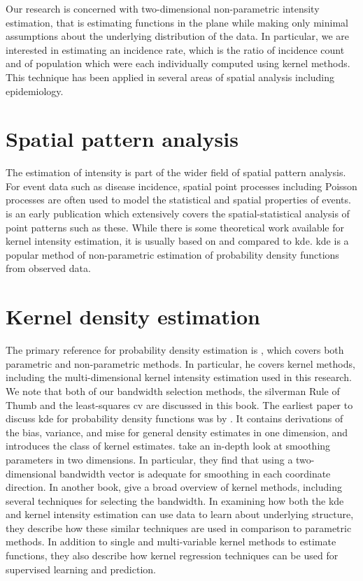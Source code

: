 

Our research is concerned with two-dimensional non-parametric intensity estimation,
that is estimating functions in the plane while making only minimal assumptions about the underlying distribution of the data. 
In particular, we are interested in estimating an incidence rate,
which is the ratio of incidence count and of population which were each individually computed using kernel methods.
This technique has been applied in several areas of spatial analysis including epidemiology.

\section{Spatial pattern analysis}

The estimation of intensity is part of the wider field of spatial pattern analysis.
For event data such as disease incidence,
spatial point processes including Poisson processes are often used to model the statistical and spatial properties of events.
 is an early publication which extensively covers the spatial-statistical analysis of point patterns such as these.
While there is some theoretical work available for \gls{kernel intensity estimation},
it is usually based on and compared to \acrfull{kde}.
\Gls{kde} is a popular method of non-parametric estimation of probability density functions from observed data.

\section{Kernel density estimation}
 
The primary reference for probability density estimation is \citet{silverman1986density},
which covers both parametric and non-parametric methods.
In particular,
he covers kernel methods,
including the multi-dimensional \gls{kernel intensity estimation} used in this research.
We note that both of our bandwidth selection methods,
the \Gls{silverman} Rule of Thumb and the least-squares \acrlong{cv} are discussed in this book.
The earliest paper to discuss \gls{kde} for probability density functions was by \citet{rosenblatt1956remarks}.
It contains derivations of the bias, variance,
and \acrfull{mise} for general density estimates in one dimension,
and introduces the class of kernel estimates.
 take an in-depth look at smoothing parameters in two dimensions.
In particular,
they find that using a two-dimensional bandwidth vector is adequate for smoothing in each coordinate direction.
In another book, \citet{wand1994kernel}
give a broad overview of kernel methods,
including several techniques for selecting the bandwidth.
In examining how both the \gls{kde} and \gls{kernel intensity estimation} can use data to learn about underlying structure,
they describe how these similar techniques are used in comparison to parametric methods.
In addition to single and multi-variable kernel methods to estimate functions,
they also describe how kernel regression techniques can be used for supervised learning and prediction.

